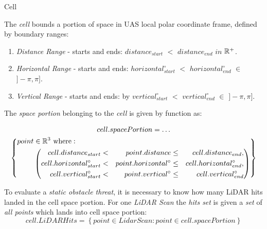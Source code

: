 \begin{definition}{Cell}\label{def:cell}
	
    \noindent The \emph{cell} bounds a portion of space in UAS local polar coordinate frame, defined by boundary ranges:
    \begin{enumerate}
        
        \item \emph{Distance Range} -  starts and ends: $distance_{start}$ $<$ $distance_{end}$ $in$ $\mathbb{R}^+$.
        
        \item \emph{Horizontal Range} - starts and ends: $horizontal^\circ_{start}$ $<$ $horizontal^\circ_{end}$ $\in$ $]-\pi,\pi]$.
        
        \item \emph{Vertical Range} - starts and ends: by $vertical^\circ_{start}$ $<$ $vertical^\circ_{end}$ $\in$ $]-\pi,\pi]$.
    \end{enumerate}
    
    \noindent The \emph{space portion} belonging to the \emph{cell} is given by function as:
    
    \begin{multline}\label{eq:boundedSpaceCell}
        cell.space Portion = \dots\\
            \left \{
                \begin{aligned}
                point& \in \mathbb{R}^3 \text{ where}:\\
                    &\left(\begin{aligned}
                        cell.distance_{start} &<& point.distance &\le& cell.distance_{end},\\
                        cell.horizontal^\circ_{start} &<& point.horizontal^\circ &\le&  cell.horizontal^\circ_{end},\\
                        cell.vertical^\circ_{start} &<& point.vertical^\circ &\le& cell.vertical^\circ_{end}\\
                    \end{aligned}\right)
                \end{aligned}
            \right\}
    \end{multline}
    
    \noindent To evaluate a \emph{static obstacle threat}, it is necessary to know how many LiDAR hits landed in the cell space portion. For one \emph{LiDAR Scan} the \emph{hits set} is given a \emph{set} of \emph{all points} which lands into cell space portion:
    \begin{equation}\label{eq:LidarHitsCell}
        cell. LiDAR Hits = \left\{point \in Lidar Scan:  point \in cell. space Portion\right\}    
    \end{equation}
    

\end{definition}
